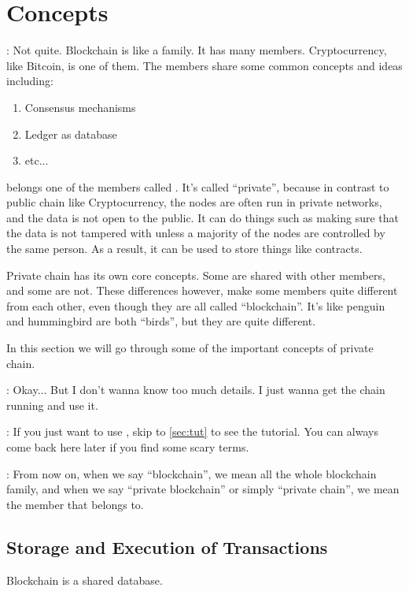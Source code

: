 
\section{Concepts}


 : Not quite. Blockchain is like a family. It has many members.
Cryptocurrency, like Bitcoin, is one of them. The members share some common
concepts and ideas including:

\begin{enumerate}
\item Consensus mechanisms
\item Ledger as database
\item etc...
\end{enumerate}

\Wch{} belongs one of the members called . It's called
``private'', because in contrast to public chain like Cryptocurrency, the nodes
are often run in private networks, and the data is not open to the public. It
can do things such as making sure that the data is not tampered with unless a
majority of the nodes are controlled by the same person. As a result, it can be used to
store things like contracts.

Private chain has its own core concepts. Some are shared with other members, and
some are not. These differences however, make some members quite different from
each other, even though they are all called ``blockchain''. It's like penguin
and hummingbird are both ``birds'', but they are quite different.

In this section we will go through some of the important concepts of
private chain. 

 : Okay... But I don't wanna know too much details. I just wanna
get the chain running and use it.

 : If you just want to use \Wch{}, skip to \cref{sec:tut} to see
the tutorial. You can always come back here later if you find some scary terms.

\begin{weakBox}[title=Some terms]
   : From now on, when we say ``blockchain'', we mean all the
  whole blockchain family, and when we say ``private blockchain'' or simply
  ``private chain'', we mean the member that \Wch{} belongs to.
\end{weakBox}

\subsection{Storage and Execution of Transactions}
Blockchain is a shared database.
